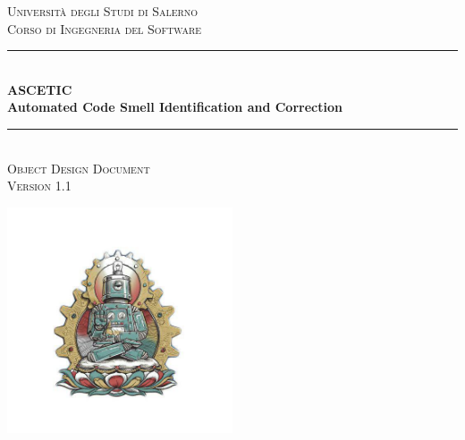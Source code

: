 \documentclass[11pt]{article}
\newcommand{\doctitle}{Object Design Document}
\begin{document}
	
	
	\begin{titlepage} %
		\newcommand{\HRule}{\rule{\linewidth}{0.5mm}} %
		
		\center %
		
		
		\textsc{\LARGE Università degli Studi di Salerno}\\
		\textsc{\large Corso di Ingegneria del Software}\\[1.5cm] %
		
		
		\HRule\\[0.4cm]
		
		{\huge\bfseries ASCETIC}\\ %
		\vspace{0.2cm}
		{\large\bfseries Automated Code Smell Identification and Correction}\\[0.2cm] %
		
		\HRule\\[1.5cm]
		
		\textsc{\Large \doctitle}\\[0.3cm] %
		
		\textsc{\large Version 1.1}\\[0.5cm] %
		
		
		
		\vfill\vfill
		
		\includegraphics[width=0.5\textwidth]{Various/ascetic_logo.jpg}\\[1cm] %
		

\end{titlepage}
\end{document}

